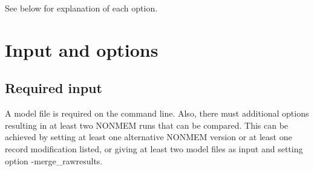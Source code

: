 See below for explanation of each option.

	\section{Input and options}

		\subsection{Required input}
		A model file is required on the command line. 
		Also, there must additional options resulting in at least two NONMEM runs that can be compared. This can be
		achieved by setting at least one alternative NONMEM version or at least one record modification listed,
		or giving at least two model files as input and setting option -merge\_rawresults. 
	
